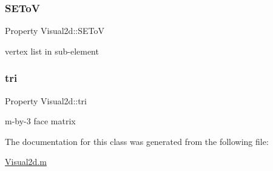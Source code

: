 \subsubsection{\texorpdfstring{S\+E\+ToV}{SEToV}}
{\footnotesize\ttfamily Property Visual2d\+::\+S\+E\+ToV\hspace{0.3cm}{\ttfamily [protected]}}



vertex list in sub-\/element 

\mbox{\label{class_visual2d_a18565fea69868aeb5a70b3fee03d635d}} 
\subsubsection{\texorpdfstring{tri}{tri}}
{\footnotesize\ttfamily Property Visual2d\+::tri\hspace{0.3cm}{\ttfamily [protected]}}



m-\/by-\/3 face matrix 



The documentation for this class was generated from the following file\+:\begin{DoxyCompactItemize}
\item 
\hyperlink{_visual2d_8m}{Visual2d.\+m}\end{DoxyCompactItemize}
